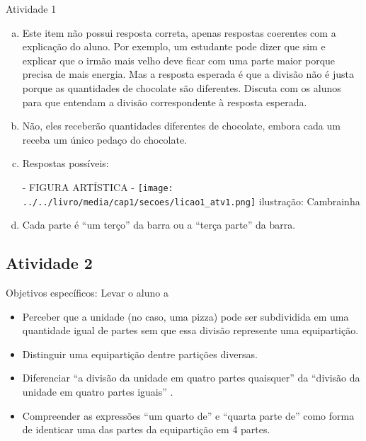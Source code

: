 \documentclass[oneside]{book}
\begin{document}
\begin{multicols}{2}
\vfill

\begin{resposta*}{Atividade 1}
  \begin{enumerate}[a),wide,labelindent=0pt] %
    \item       Este item não possui resposta correta, apenas respostas coerentes com a explicação do aluno. Por exemplo, um estudante pode dizer que sim e explicar que o irmão mais velho deve ficar com uma parte maior porque precisa de mais energia. Mas a resposta esperada é que a divisão não é justa porque as quantidades de chocolate são diferentes. Discuta com os alunos para que entendam a divisão correspondente à resposta esperada.
    \item       Não, eles receberão quantidades diferentes de chocolate, embora cada um receba um único pedaço do chocolate.
    \item       Respostas possíveis:
  \begin{imagem*}[breakable]{}{}      - FIGURA ARTÍSTICA -    \mbox{} \newline              \texttt{[image: ../../livro/media/cap1/secoes/licao1\_atv1.png]}    \mbox{} \newline      ilustração: Cambrainha   \end{imagem*}
    \item       Cada parte é       ``um terço''       da barra ou a       ``terça parte''       da barra.
\end{enumerate} %
\end{resposta*}




\subsection{Atividade 2}

  Objetivos específicos: Levar o aluno a

\begin{itemize} %
    \item       Perceber que a unidade (no caso, uma pizza) pode ser subdividida em uma quantidade igual de partes sem que essa divisão represente uma equipartição.
    \item       Distinguir uma equipartição dentre partições diversas.
    \item       Diferenciar       ``a divisão da unidade em quatro partes quaisquer''       da       ``divisão da unidade em quatro partes iguais''      .
    \item       Compreender as expressões       ``um quarto de''       e       ``quarta parte de''       como forma de identicar uma das partes da equipartição em 4 partes.
\end{itemize} %



\end{multicols}
\end{document}
